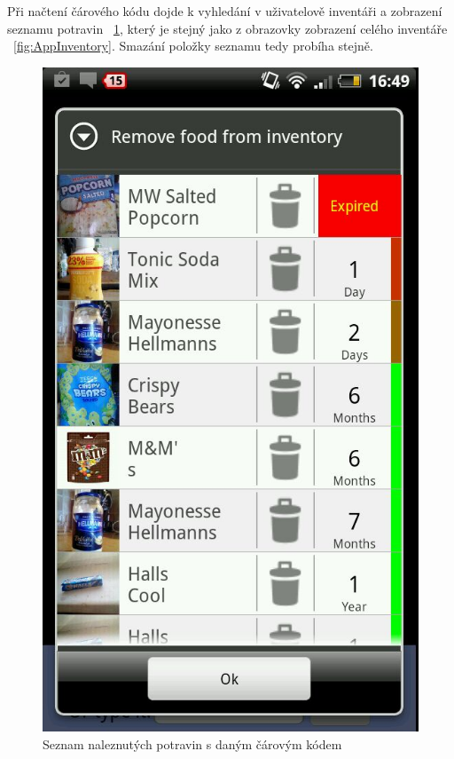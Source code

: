\documentclass[thesis=B,czech]{FITthesis}[2013/10/20]
\begin{document}
Při načtení čárového kódu dojde k vyhledání v uživatelově inventáři a zobrazení seznamu potravin ~\ref{fig:AppScanRemoveList}, který je stejný jako z obrazovky zobrazení celého inventáře ~\ref{fig:AppInventory}. Smazání položky seznamu tedy probíha stejně.

\begin{figure}[H]
  \centering
  \includegraphics[scale=0.4]{screenshots/app_scan_remove_list.jpg}
  \caption{Seznam naleznutých potravin s daným čárovým kódem}
  \label{fig:AppScanRemoveList}
\end{figure}
\end{document}
